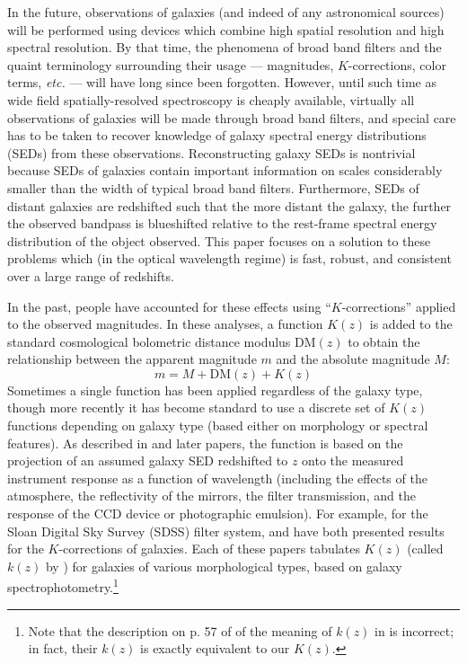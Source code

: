 \documentclass[10pt,preprint]{aastex}
\begin{document}
In the future, observations of galaxies (and indeed of any
astronomical sources) will be performed using devices which combine
high spatial resolution and high spectral resolution. By that time,
the phenomena of broad band filters and the quaint terminology
surrounding their usage --- magnitudes, $K$-corrections, color terms,
{\it etc.} --- will have long since been forgotten. However, until
such time as wide field spatially-resolved spectroscopy is cheaply
available, virtually all observations of galaxies will be made through
broad band filters, and special care has to be taken to recover
knowledge of galaxy spectral energy distributions (SEDs) from these
observations.  Reconstructing galaxy SEDs is nontrivial because SEDs
of galaxies contain important information on scales considerably
smaller than the width of typical broad band filters. Furthermore,
SEDs of distant galaxies are redshifted such that the more distant the
galaxy, the further the observed bandpass is blueshifted relative to
the rest-frame spectral energy distribution of the object observed.
This paper focuses on a solution to these problems which (in the
optical wavelength regime) is fast, robust, and consistent over a
large range of redshifts.

In the past, people have accounted for these effects using
``$K$-corrections'' applied to the observed magnitudes. In these
analyses, a function $K(z)$ is added to the standard cosmological
bolometric distance modulus $\mathrm{DM}(z)$ to obtain the
relationship between the apparent magnitude $m$ and the absolute
magnitude $M$: 
\begin{equation}
m = M + \mathrm{DM}(z) + K(z)
\end{equation}
Sometimes a single function has been applied regardless of the galaxy
type, though more recently it has become standard to use a discrete
set of $K(z)$ functions depending on galaxy type (based either on
morphology or spectral features). As described in \cite{oke68a} and
later papers, the function is based on the projection of an assumed
galaxy SED redshifted to $z$ onto the measured instrument response as
a function of wavelength (including the effects of the atmosphere, the
reflectivity of the mirrors, the filter transmission, and the response
of the CCD device or photographic emulsion). For example, for the
Sloan Digital Sky Survey (SDSS) filter system, \citet{frei94a} and
\citet{fukugita95a} have both presented results for the
$K$-corrections of galaxies. Each of these papers tabulates $K(z)$
(called $k(z)$ by \citealt{frei94a}) for galaxies of various
morphological types, based on galaxy spectrophotometry.\footnote{Note
that the description on p. 57 of \citet{binney98a} of the meaning of
$k(z)$ in \citet{frei94a} is incorrect; in fact, their $k(z)$ is
exactly equivalent to our $K(z)$.}
\end{document}
